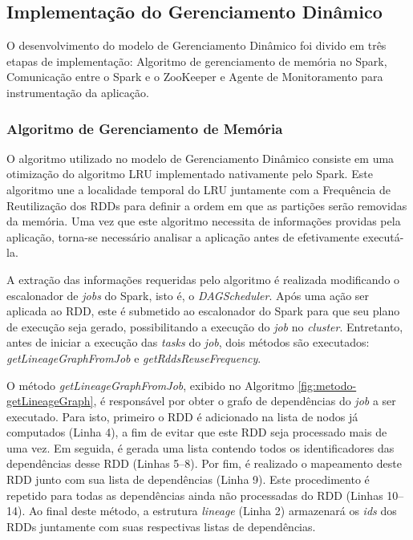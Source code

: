 \subsection{Implementação do Gerenciamento Dinâmico}
O desenvolvimento do modelo de Gerenciamento Dinâmico foi divido em três etapas de implementação: Algoritmo de gerenciamento de memória no Spark, Comunicação entre o Spark e o ZooKeeper e Agente de Monitoramento para instrumentação da aplicação.

\subsubsection{Algoritmo de Gerenciamento de Memória}
O algoritmo utilizado no modelo de Gerenciamento Dinâmico consiste em uma otimização do algoritmo LRU implementado nativamente pelo Spark. Este algoritmo une a localidade temporal do LRU juntamente com a Frequência de Reutilização dos RDDs para definir a ordem em que as partições serão removidas da memória. Uma vez que este algoritmo necessita de informações providas pela aplicação, torna-se necessário analisar a aplicação antes de efetivamente executá-la.

A extração das informações requeridas pelo algoritmo é realizada modificando o escalonador de \textit{jobs} do Spark, isto é, o \textit{DAGScheduler}. Após uma ação ser aplicada ao RDD, este é submetido ao escalonador do Spark para que seu plano de execução seja gerado, possibilitando a execução do \textit{job} no \textit{cluster}. Entretanto, antes de iniciar a execução das \textit{tasks} do \textit{job}, dois métodos são executados: \textit{getLineageGraphFromJob} e \textit{getRddsReuseFrequency}.

O método \textit{getLineageGraphFromJob}, exibido no Algoritmo \ref{fig:metodo-getLineageGraph}, é responsável por obter o grafo de dependências do \textit{job} a ser executado. Para isto, primeiro o RDD é adicionado na lista de nodos já computados (Linha 4), a fim de evitar que este RDD seja processado mais de uma vez. Em seguida, é gerada uma lista contendo todos os identificadores das dependências desse RDD (Linhas 5--8). Por fim, é realizado o mapeamento deste RDD junto com sua lista de dependências (Linha 9). Este procedimento é repetido para todas as dependências ainda não processadas do RDD (Linhas 10--14). Ao final deste método, a estrutura \textit{lineage} (Linha 2) armazenará os \textit{ids} dos RDDs juntamente com suas respectivas listas de dependências.



